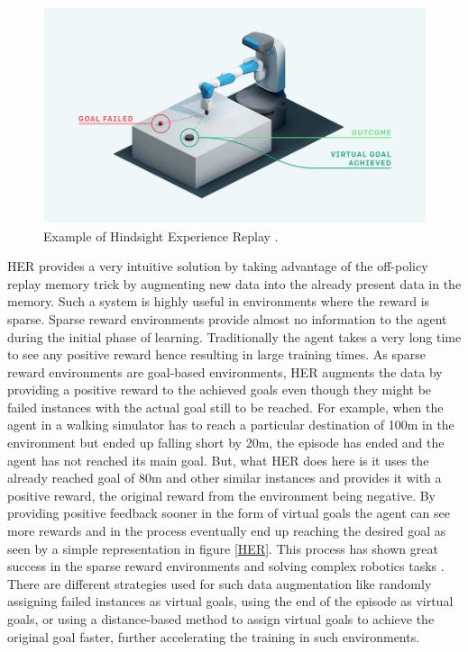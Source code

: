 \begin{figure}[h!]
    \centering
    \includegraphics[width=\textwidth]{images/HER.png}
    \caption{Example of Hindsight Experience Replay \cite{andrychowicz2018hindsight} \cite{plappert2018multigoal}.}
    \label{fig:AC}
\end{figure}

HER provides a very intuitive solution by taking advantage of the off-policy replay memory trick by augmenting new data into the already present data in the memory. Such a system is highly useful in environments where the reward is sparse. Sparse reward environments provide almost no information to the agent during the initial phase of learning. Traditionally the agent takes a very long time to see any positive reward hence resulting in large training times. As sparse reward environments are goal-based environments, HER augments the data by providing a positive reward to the achieved goals even though they might be failed instances with the actual goal still to be reached. For example, when the agent in a walking simulator has to reach a particular destination of 100m in the environment but ended up falling short by 20m, the episode has ended and the agent has not reached its main goal. But, what HER does here is it uses the already reached goal of 80m and other similar instances and provides it with a positive reward, the original reward from the environment being negative. By providing positive feedback sooner in the form of virtual goals the agent can see more rewards and in the process eventually end up reaching the desired goal as seen by a simple representation in figure \ref{HER}. This process has shown great success in the sparse reward environments and solving complex robotics tasks \cite{plappert2018multigoal}. There are different strategies used for such data augmentation like randomly assigning failed instances as virtual goals, using the end of the episode as virtual goals, or using a distance-based method \cite{HERER} to assign virtual goals to achieve the original goal faster, further accelerating the training in such environments. \\

